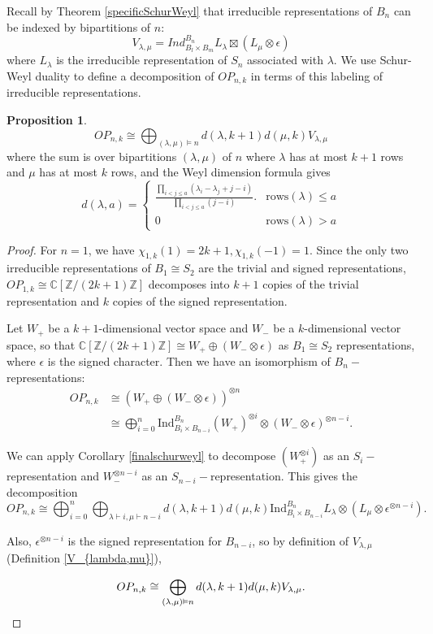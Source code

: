 \documentclass{amsart}
\theoremstyle{plain}
\theoremstyle{definition}
\newtheorem{proposition}[theorem]{Proposition}
\begin{document}
Recall by Theorem \ref{specificSchurWeyl} that irreducible representations  of $B_n$ can be indexed by bipartitions of $n$: 
$$V_{\lambda, \mu} = Ind_{B_{l} \times B_{m}}^{B_n} L_{\lambda} \boxtimes (L_{\mu} \otimes \epsilon)$$
where $L_{\lambda}$ is the irreducible representation of $S_n$ associated with $\lambda$. We use Schur-Weyl duality to define a decomposition of $OP_{n,k}$ in terms of this labeling of irreducible representations. 
\begin{proposition}\label{OPdecomp}
   $$
        OP_{n, k} \cong \bigoplus_{(\lambda,\mu) \vDash n} d(\lambda, k+1) d(\mu, k) V_{\lambda,\mu}
   $$
    where the sum is over bipartitions $(\lambda,\mu)$ of $n$ where $\lambda$ has at most $k+1$ rows and $\mu$ has at most $k$ rows, and the Weyl dimension formula gives
    $$d(\lambda,a)=\begin{cases} \frac{\prod_{i < j \leq a} (\lambda_i - \lambda_j+j-i)}{\prod_{i<j \leq a}{(j-i)}}. & \text{rows}(\lambda)\le a \\
    0 & \text{rows}(\lambda)>a\end{cases}$$
\end{proposition}
\begin{proof}

For $n=1$, we have $\chi_{1,k}(1)=2k+1, \chi_{1,k}(-1)=1.$ Since the only two irreducible representations of $B_1\cong S_2$ are the trivial and signed representations, $OP_{1,k}\cong \mathbb{C}[\mathbb{Z}/(2k+1)\mathbb{Z}]$ decomposes into $k+1$ copies of the trivial representation and $k$ copies of the signed representation.

Let $W_+$ be a $k+1$-dimensional vector space and $W_-$ be a $k$-dimensional vector space, so that $\mathbb{C}[\mathbb{Z}/(2k+1)\mathbb{Z}] \cong W_+ \oplus (W_- \otimes \epsilon)$ as $B_1\cong S_2$ representations, where $\epsilon$ is the signed character. Then we have an isomorphism of $B_n-$representations:
\begin{align*}
	OP_{n,k} &\cong  (W_+ \oplus (W_- \otimes \epsilon))^{\otimes n} \\
    	&\cong  \bigoplus_{i=0}^n \mathrm{Ind}_{B_i \times B_{n-i}}^{B_n} (W_+)^{\otimes i} \otimes (W_- \otimes \epsilon)^{\otimes n-i}. 
\end{align*}

We can apply Corollary \ref{finalschurweyl} to decompose $(W_+^{\otimes i})$ as an $S_i-$representation and $W_-^{\otimes n-i}$ as an $S_{n-i}-$representation. 
This gives the decomposition 
$$ OP_{n,k}\cong \bigoplus_{i=0}^{n}\bigoplus_{\lambda\vdash i,\mu\vdash n-i} d(\lambda,k+1)d(\mu,k) \mathrm{Ind}_{B_{i}\times B_{n-i}}^{B_n}L_{\lambda} \otimes (L_{\mu}\otimes \epsilon^{\otimes n-i}). $$


 Also, $\epsilon^{\otimes n-i}$ is the signed representation for $B_{n-i}$, so by definition of $V_{\lambda,\mu}$ (Definition \ref{V_{lambda,mu}}),
 
 $$  OP_{n, k} \cong \bigoplus_{(\lambda,\mu) \vDash n} d(\lambda, k+1) d(\mu, k) V_{\lambda,\mu}.\qedhere$$

\end{proof}
\end{document}
